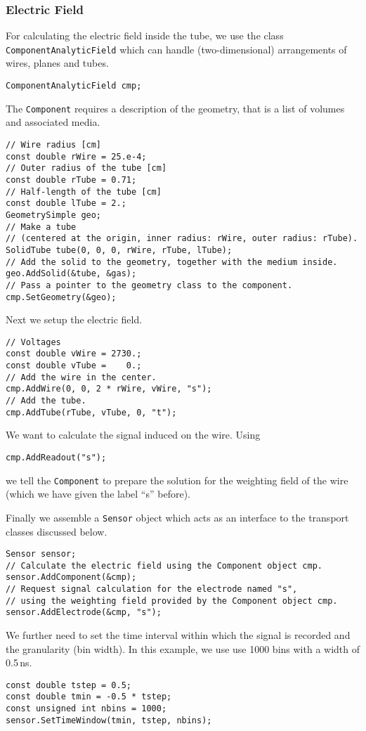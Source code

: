 \subsubsection{Electric Field}
For calculating the electric field inside the tube, 
we use the class \texttt{ComponentAnalyticField} which can handle 
(two-dimensional) arrangements of wires, planes and tubes.
\begin{lstlisting}
ComponentAnalyticField cmp;
\end{lstlisting} 
The \texttt{Component} requires a description of the 
geometry, that is a list of volumes and associated media.
\begin{lstlisting}
// Wire radius [cm]
const double rWire = 25.e-4;
// Outer radius of the tube [cm]
const double rTube = 0.71;
// Half-length of the tube [cm]
const double lTube = 2.;
GeometrySimple geo;
// Make a tube 
// (centered at the origin, inner radius: rWire, outer radius: rTube).
SolidTube tube(0, 0, 0, rWire, rTube, lTube);
// Add the solid to the geometry, together with the medium inside.
geo.AddSolid(&tube, &gas);
// Pass a pointer to the geometry class to the component.
cmp.SetGeometry(&geo); 
\end{lstlisting}
Next we setup the electric field.
\begin{lstlisting}
// Voltages
const double vWire = 2730.;
const double vTube =    0.;
// Add the wire in the center.
cmp.AddWire(0, 0, 2 * rWire, vWire, "s");
// Add the tube.
cmp.AddTube(rTube, vTube, 0, "t");
\end{lstlisting}
We want to calculate the signal induced on the wire. 
Using 
\begin{lstlisting}
cmp.AddReadout("s");
\end{lstlisting}
we tell the \texttt{Component} to prepare the solution for the weighting field 
of the wire (which we have given the label ``s'' before).
 
Finally we assemble a \texttt{Sensor} object which acts as an 
interface to the transport classes discussed below.
\begin{lstlisting}
Sensor sensor;
// Calculate the electric field using the Component object cmp.
sensor.AddComponent(&cmp);
// Request signal calculation for the electrode named "s", 
// using the weighting field provided by the Component object cmp.
sensor.AddElectrode(&cmp, "s"); 
\end{lstlisting}
We further need to set the time interval within which the
signal is recorded and the granularity (bin width). 
In this example, we use use 1000 bins with a width of 0.5\,ns.
\begin{lstlisting}
const double tstep = 0.5;
const double tmin = -0.5 * tstep;
const unsigned int nbins = 1000;
sensor.SetTimeWindow(tmin, tstep, nbins);
\end{lstlisting}

